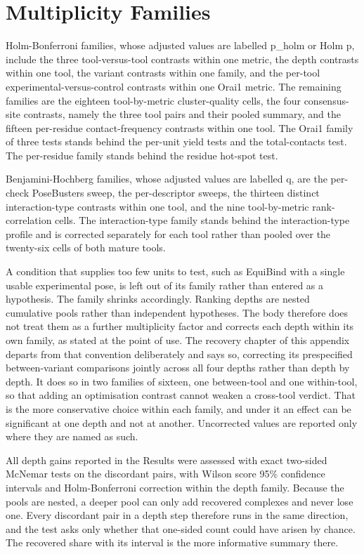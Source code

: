 \hypertarget{multiplicity-families}{%
\section{Multiplicity Families}\label{multiplicity-families}}

Holm-Bonferroni families, whose adjusted values are labelled p\_holm or Holm p, include the three tool-versus-tool contrasts within one metric, the depth contrasts within one tool, the variant contrasts within one family, and the per-tool experimental-versus-control contrasts within one Orai1 metric. The remaining families are the eighteen tool-by-metric cluster-quality cells, the four consensus-site contrasts, namely the three tool pairs and their pooled summary, and the fifteen per-residue contact-frequency contrasts within one tool. The Orai1 family of three tests stands behind the per-unit yield tests and the total-contacts test. The per-residue family stands behind the residue hot-spot test.

Benjamini-Hochberg families, whose adjusted values are labelled q, are the per-check PoseBusters sweep, the per-descriptor sweeps, the thirteen distinct interaction-type contrasts within one tool, and the nine tool-by-metric rank-correlation cells. The interaction-type family stands behind the interaction-type profile and is corrected separately for each tool rather than pooled over the twenty-six cells of both mature tools.

A condition that supplies too few units to test, such as EquiBind with a single usable experimental pose, is left out of its family rather than entered as a hypothesis. The family shrinks accordingly. Ranking depths are nested cumulative pools rather than independent hypotheses. The body therefore does not treat them as a further multiplicity factor and corrects each depth within its own family, as stated at the point of use. The recovery chapter of this appendix departs from that convention deliberately and says so, correcting its prespecified between-variant comparisons jointly across all four depths rather than depth by depth. It does so in two families of sixteen, one between-tool and one within-tool, so that adding an optimisation contrast cannot weaken a cross-tool verdict. That is the more conservative choice within each family, and under it an effect can be significant at one depth and not at another. Uncorrected values are reported only where they are named as such.

All depth gains reported in the Results were assessed with exact two-sided McNemar tests on the discordant pairs, with Wilson score 95\% confidence intervals and Holm-Bonferroni correction within the depth family. Because the pools are nested, a deeper pool can only add recovered complexes and never lose one. Every discordant pair in a depth step therefore runs in the same direction, and the test asks only whether that one-sided count could have arisen by chance. The recovered share with its interval is the more informative summary there.

